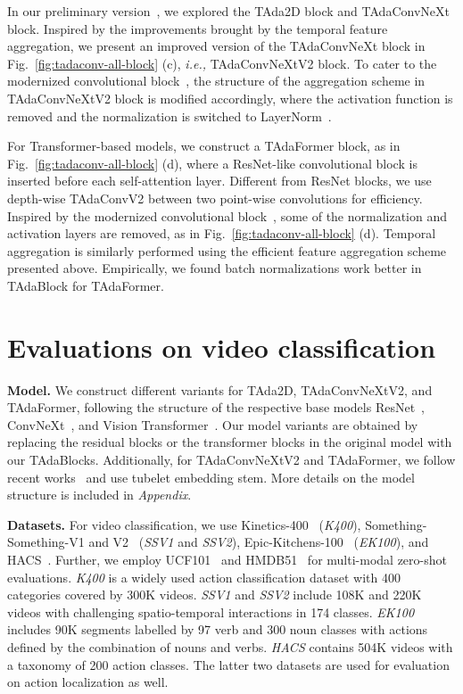 \documentclass[10pt,journal,compsoc]{IEEEtran}
\begin{document}
In our preliminary version~\cite{huangtada}, we explored the TAda2D block and TAdaConvNeXt block. Inspired by the improvements brought by the temporal feature aggregation, we present an improved version of the TAdaConvNeXt block in Fig.~\ref{fig:tadaconv-all-block} (c), \textit{i.e.,} TAdaConvNeXtV2 block. 
To cater to the modernized convolutional block~\cite{convnext}, the structure of the aggregation scheme in TAdaConvNeXtV2 block is modified accordingly, where the activation function is removed and the normalization is switched to LayerNorm~\cite{ba2016layernorm}.

For Transformer-based models, we construct a TAdaFormer block, as in Fig.~\ref{fig:tadaconv-all-block} (d), where a ResNet-like convolutional block is inserted before each self-attention layer. Different from ResNet blocks, we use depth-wise TAdaConvV2 between two point-wise convolutions for efficiency. Inspired by the modernized convolutional block~\cite{convnext}, some of the normalization and activation layers are removed, as in Fig.~\ref{fig:tadaconv-all-block} (d). Temporal aggregation is similarly performed using the efficient feature aggregation scheme presented above. Empirically, we found batch normalizations work better in TAdaBlock for TAdaFormer. 

\section{Evaluations on video classification}

\textbf{Model.} 
We construct different variants for TAda2D, TAdaConvNeXtV2, and TAdaFormer, following the structure of the respective base models ResNet~\cite{resnet}, ConvNeXt~\cite{convnext}, and Vision Transformer~\cite{dosovitskiy2020vit}. Our model variants are obtained by replacing the residual blocks or the transformer blocks in the original model with our TAdaBlocks. Additionally, for TAdaConvNeXtV2 and TAdaFormer, we follow recent works~\cite{videoswin,arnab2021vivit} and use tubelet embedding stem. More details on the model structure is included in \textit{Appendix}.

\textbf{Datasets.}
For video classification, we use Kinetics-400~\cite{kinetics400} (\textit{K400}), Something-Something-V1 and V2~\cite{ssv2} (\textit{SSV1} and \textit{SSV2}), Epic-Kitchens-100~\cite{ek100} (\textit{EK100}),  and HACS~\cite{hacs}. 
Further, we employ UCF101~\cite{soomro2012ucf101} and HMDB51~\cite{kuehne2011hmdb} for multi-modal zero-shot evaluations.
\textit{K400} is a widely used action classification dataset with 400 categories covered by 300K videos.
\textit{SSV1} and \textit{SSV2} include 108K and 220K videos with challenging spatio-temporal interactions in 174 classes.
\textit{EK100} includes 90K segments labelled by 97 verb and 300 noun classes with actions defined by the combination of nouns and verbs. 
\textit{HACS} contains 504K videos with a taxonomy of 200 action classes. The latter two datasets are used for evaluation on action localization as well. 
\end{document}

